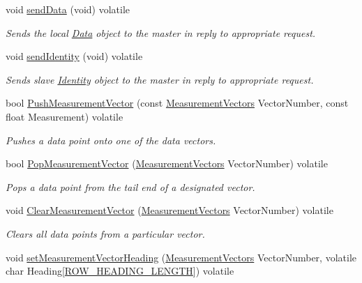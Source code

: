 \begin{DoxyCompactItemize}
void \mbox{\hyperlink{class_master_a7e73d29d4d8d714b9c5ea69f18cad396}{send\+Data}} (void) volatile
\begin{DoxyCompactList}\small\item\em Sends the local \mbox{\hyperlink{struct_data}{Data}} object to the master in reply to appropriate request. \end{DoxyCompactList}\item 
void \mbox{\hyperlink{class_master_a9ebd71ad45ea73524c87724b9c5e5e2f}{send\+Identity}} (void) volatile
\begin{DoxyCompactList}\small\item\em Sends slave \mbox{\hyperlink{struct_identity}{Identity}} object to the master in reply to appropriate request. \end{DoxyCompactList}\item 
bool \mbox{\hyperlink{class_master_ac907bfa48b84098a906c63c933cc373d}{Push\+Measurement\+Vector}} (const \mbox{\hyperlink{_s_p_i___instruction_set_8h_a9d8048399836e11887f85cc8dc3d75d5}{Measurement\+Vectors}} Vector\+Number, const float Measurement) volatile
\begin{DoxyCompactList}\small\item\em Pushes a data point onto one of the data vectors. \end{DoxyCompactList}\item 
bool \mbox{\hyperlink{class_master_ad64bb8e32e356747d0f80fce966a3574}{Pop\+Measurement\+Vector}} (\mbox{\hyperlink{_s_p_i___instruction_set_8h_a9d8048399836e11887f85cc8dc3d75d5}{Measurement\+Vectors}} Vector\+Number) volatile
\begin{DoxyCompactList}\small\item\em Pops a data point from the tail end of a designated vector. \end{DoxyCompactList}\item 
void \mbox{\hyperlink{class_master_a94625b59aceffeceeae3b050885968ef}{Clear\+Measurement\+Vector}} (\mbox{\hyperlink{_s_p_i___instruction_set_8h_a9d8048399836e11887f85cc8dc3d75d5}{Measurement\+Vectors}} Vector\+Number) volatile
\begin{DoxyCompactList}\small\item\em Clears all data points from a particular vector. \end{DoxyCompactList}\item 
void \mbox{\hyperlink{class_master_a49e434ca3d09d56bac2a2d45c86661ac}{set\+Measurement\+Vector\+Heading}} (\mbox{\hyperlink{_s_p_i___instruction_set_8h_a9d8048399836e11887f85cc8dc3d75d5}{Measurement\+Vectors}} Vector\+Number, volatile char Heading\mbox{[}\mbox{\hyperlink{_s_p_i___instruction_set_8h_a63a97a0fe356d1b3030dfb633e0d0b8e}{R\+O\+W\+\_\+\+H\+E\+A\+D\+I\+N\+G\+\_\+\+L\+E\+N\+G\+TH}}\mbox{]}) volatile

\end{DoxyCompactItemize}
